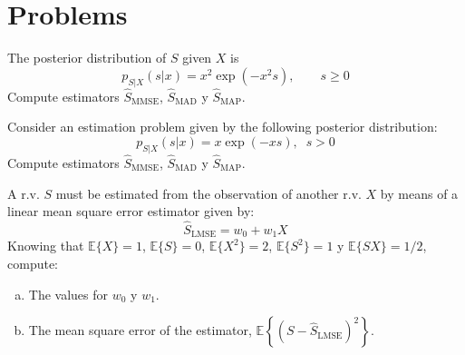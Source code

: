 
\section{Problems}

\begin{prob}
\label{MAPmulticlas1}

The posterior distribution of $S$ given $X$ is 
\[p_{S|X}(s|x) = x^2 \exp(-x^2 s), \qquad s\ge 0
\]
Compute estimators $\hat{S}_{\text{MMSE}}$, $\hat{S}_{\text{MAD}}$ y $\hat{S}_{\text{MAP}}$.

\end{prob}


\begin{prob}
\label{ProbSexponencial}

Consider an estimation problem given by the following posterior distribution:
\begin{equation}
p_{S|{X}}(s|{x}) = x \exp({-x s}),\;\; s>0
\end{equation}
Compute estimators $\hat{S}_{\text{MMSE}}$, $\hat{S}_{\text{MAD}}$ y $\hat{S}_{\text{MAP}}$.

\end{prob}


\begin{prob}
\label{ProbEstLMSE}

A r.v. $S$ must be estimated from the observation of another r.v. $X$ by means of a linear mean square error estimator given by:
\[\hat S_{\text{LMSE}} = w_0 + w_1 X \]
Knowing that $\mathbb E \lbrace X \rbrace= 1$, $\mathbb E \lbrace S \rbrace= 0$, $\mathbb E \lbrace X^2 \rbrace= 2$, $\mathbb E \lbrace S^2 \rbrace= 1$ y $\mathbb E \lbrace SX \rbrace= 1/2$, compute:
\begin{enumerate}[a)]
\item The values for $w_0$ y $w_1$.
\item The mean square error of the estimator, $\mathbb E \left\lbrace  \left( S-\hat S_{\text{LMSE}}\right)^2 \right\rbrace$.
\end{enumerate}

\end{prob}

